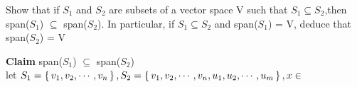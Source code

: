 Show that if $S_1$ and $S_2$ are subsets of a vector space $\mathrm{V}$ such that $S_1 \subseteq S_2$,then span($S_1$) $\subseteq$ span($S_2$). In particular, if $S_1 \subseteq S_2$ and span($S_1$) = $\mathrm{V}$, deduce that span($S_2$) = $\mathrm{V}$

\begin{tcolorbox}
	\begin{solution}
		
		\textbf{Claim} span($S_1$) $\subseteq$ span($S_2$)\\
		let $S_1 = \left\{ \,v_1,v_2,\cdots,v_n \,\right\}, S_2 = \left\{ \,v_1,v_2,\cdots,v_n,u_1,u_2,\cdots,u_m \,\right\}, x \in $\\
		
		
	\end{solution}
\end{tcolorbox}